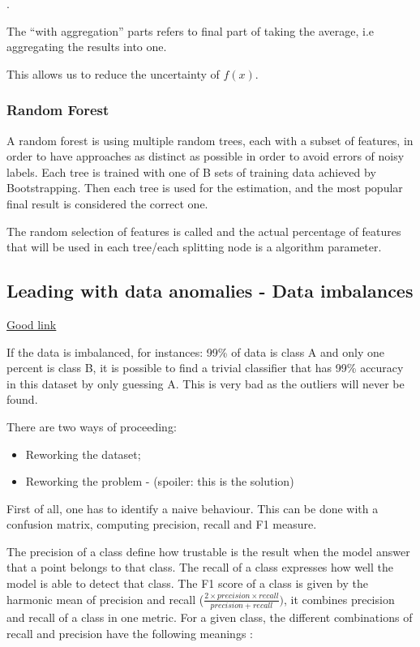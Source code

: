 
.

The ``with aggregation'' parts refers to final part of taking the average, i.e aggregating the results into one.

This allows us to reduce the uncertainty of $f(x)$.

\subsubsection{Random Forest}

A random forest is using multiple random trees, each with a subset of features, in order to have approaches as distinct as possible in order to avoid errors of noisy labels. Each tree is trained with one of B sets of training data achieved by Bootstrapping. Then each tree is used for the estimation, and the most popular final result is considered the correct one.

The random selection of features is called  and the actual percentage of features that will be used in each tree/each splitting node is a algorithm parameter. 

\subsection{Leading with data anomalies - Data imbalances}

\href{https://towardsdatascience.com/handling-imbalanced-datasets-in-machine-learning-7a0e84220f28}{\ul{Good link}}

If the data is imbalanced, for instances: 99\% of data is class A and only one percent is class B, it is possible to find a trivial classifier that has 99\% accuracy in this dataset by only guessing A. This is very bad as the outliers will never be found. 

There are two ways of proceeding:
\begin{itemize}
    \item Reworking the dataset;
    \item Reworking the problem - (spoiler: this is the solution)
\end{itemize}

First of all, one has to identify a naive behaviour. This can be done with a confusion matrix, computing precision, recall and F1 measure.

The precision of a class define how trustable is the result when the model answer that a point belongs to that class. The recall of a class expresses how well the model is able to detect that class. The F1 score of a class is given by the harmonic mean of precision and recall ($\frac{2\times precision \times recall}{precision + recall})$, it combines precision and recall of a class in one metric. For a given class, the different combinations of recall and precision have the following meanings :


